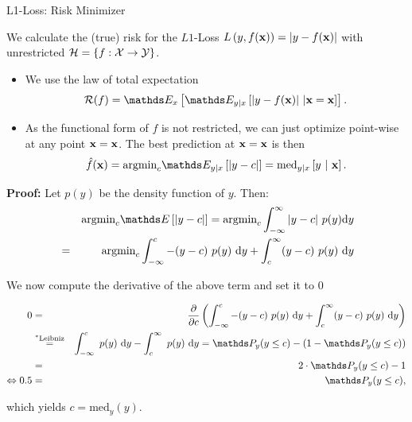 \documentclass[11pt,compress,t,notes=noshow, xcolor=table]{beamer}
\begin{document}
\begin{vbframe}{L1-Loss: Risk Minimizer}

We calculate the (true) risk for the $L1$-Loss $L\left(y, f(\mathbf{x})\right) = \left|y-f(\mathbf{x})\right|$ with unrestricted $\mathcal{H} = \{f: \mathcal{X} \to \mathcal{Y}\}$. 

\vspace{0.5cm}

\begin{itemize}
  \setlength{\itemsep}{1.4em}  
  \item We use the law of total expectation
  \vspace{0.3cm}
  $$
    \riskf = \E_x \left[\E_{y|x}\left[|y-\fx|~|\xv = \xv\right]\right]. 
  $$
  \item As the functional form of $f$ is not restricted, we can just optimize point-wise at any point $\mathbf{x} = \mathbf{x}$. The best prediction at $\mathbf{x} = \mathbf{x}$ is then 
  \vspace{0.3cm}  
  $$
    \fxh = \mbox{argmin}_c \E_{y|x}\left[|y - c|\right]= \text{med}_{y|x} \left[y ~|~ \xv \right]. 
  $$

\end{itemize}

  \framebreak 

\begin{footnotesize}
\textbf{Proof:} Let $p(y)$ be the density function of $y$. Then: 
  \begin{eqnarray*}
  && \mbox{argmin}_c \E\left[|y - c|\right] = \mbox{argmin}_c \int_{-\infty}^\infty |y - c| ~ p(y) \text{d}y \\
  &=& \mbox{argmin}_c \int_{-\infty}^c -(y - c)~p(y)~\text{d}y + \int_c^\infty (y - c)~p(y)~\text{d}y 
  \end{eqnarray*}

We now compute the derivative of the above term and set it to $0$

\begin{eqnarray*}
0 &=& \frac{\partial}{\partial c} \left(\int_{-\infty}^c -(y - c)~p(y)~\text{d}y + \int_c^\infty (y - c)~p(y)~\text{d}y\right) \\ &\overset{^\ast\text{Leibniz}}{=}& \int_{-\infty}^c  ~p(y)~\text{d}y - \int_c^\infty ~p(y)~\text{d}y =   \P_y (y \le c) - \left(1 - \P_y (y \le c)\right) \\
&=& 2 \cdot \P_y (y \le c) - 1 \\
\Leftrightarrow 0.5 &=& \P_y (y \le c),
\end{eqnarray*}

which yields $c = \text{med}_y(y)$. 


\end{footnotesize}
\end{vbframe}
\end{document}
